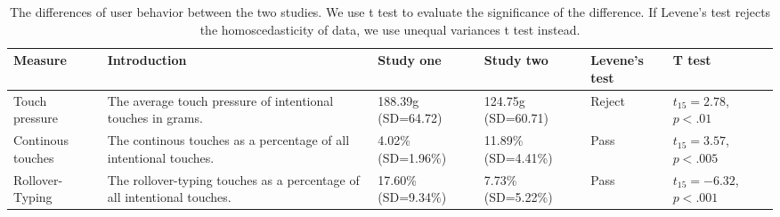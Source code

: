 

\begin{table}[htbp]
  \centering
  \caption{The differences of user behavior between the two studies. We use t test to evaluate the significance of the difference. If Levene's test rejects the homoscedasticity of data, we use unequal variances t test instead.}
    \begin{tabular}{|p{5em}|p{15em}|p{4.8em}|p{4.8em}|p{3.5em}|p{4.8em}|}
    \toprule
    \textbf{Measure} & \textbf{Introduction} & \textbf{Study one} & \textbf{Study two} & \textbf{Levene's test} & \textbf{T test} \\
    \toprule
    Touch pressure & The average touch pressure of intentional touches in grams. & 188.39g (SD=64.72) & 124.75g (SD=60.71) & Reject & $t_{15}=2.78$, $p<.01$ \\
    \midrule
    Continous touches & The continous touches as a percentage of all intentional touches. & 4.02\% (SD=1.96\%) & 11.89\% (SD=4.41\%) & Pass  & $t_{15}=3.57$, $p<.005$ \\
    \midrule
    Rollover-Typing & The rollover-typing touches as a percentage of all intentional touches. & 17.60\% (SD=9.34\%) & 7.73\% (SD=5.22\%) & Pass  & $t_{15}=-6.32$, $p<.001$ \\
    \toprule
    \end{tabular}%
  \label{tab:behavior_difference}%
\end{table}%



